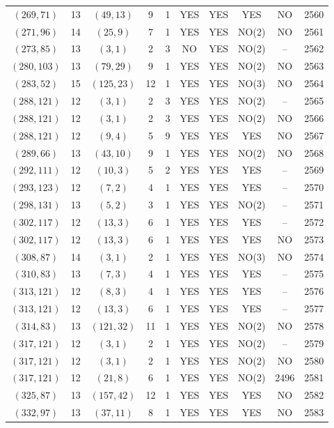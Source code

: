 \begin{longtable}{|c|c|c|c|c|c|c|c|c|c|}
$(269, 71)$ & 13 & $(49, 13)$ & 9 & 1 & YES & YES & YES & NO & 2560\\
$(271, 96)$ & 14 & $(25, 9)$ & 7 & 1 & YES & YES & NO(2) & NO & 2561\\
$(273, 85)$ & 13 & $(3, 1)$ & 2 & 3 & NO & YES & NO(2) & -- & 2562\\
$(280, 103)$ & 13 & $(79, 29)$ & 9 & 1 & YES & YES & NO(2) & NO & 2563\\
$(283, 52)$ & 15 & $(125, 23)$ & 12 & 1 & YES & YES & NO(3) & NO & 2564\\
$(288, 121)$ & 12 & $(3, 1)$ & 2 & 3 & YES & YES & NO(2) & -- & 2565\\
$(288, 121)$ & 12 & $(3, 1)$ & 2 & 3 & YES & YES & NO(2) & NO & 2566\\
$(288, 121)$ & 12 & $(9, 4)$ & 5 & 9 & YES & YES & YES & NO & 2567\\
$(289, 66)$ & 13 & $(43, 10)$ & 9 & 1 & YES & YES & NO(2) & NO & 2568\\
$(292, 111)$ & 12 & $(10, 3)$ & 5 & 2 & YES & YES & YES & -- & 2569\\
$(293, 123)$ & 12 & $(7, 2)$ & 4 & 1 & YES & YES & YES & -- & 2570\\
$(298, 131)$ & 13 & $(5, 2)$ & 3 & 1 & YES & YES & NO(2) & -- & 2571\\
$(302, 117)$ & 12 & $(13, 3)$ & 6 & 1 & YES & YES & YES & -- & 2572\\
$(302, 117)$ & 12 & $(13, 3)$ & 6 & 1 & YES & YES & YES & NO & 2573\\
$(308, 87)$ & 14 & $(3, 1)$ & 2 & 1 & YES & YES & NO(3) & NO & 2574\\
$(310, 83)$ & 13 & $(7, 3)$ & 4 & 1 & YES & YES & YES & -- & 2575\\
$(313, 121)$ & 12 & $(8, 3)$ & 4 & 1 & YES & YES & YES & -- & 2576\\
$(313, 121)$ & 12 & $(13, 3)$ & 6 & 1 & YES & YES & YES & -- & 2577\\
$(314, 83)$ & 13 & $(121, 32)$ & 11 & 1 & YES & YES & NO(2) & NO & 2578\\
$(317, 121)$ & 12 & $(3, 1)$ & 2 & 1 & YES & YES & NO(2) & -- & 2579\\
$(317, 121)$ & 12 & $(3, 1)$ & 2 & 1 & YES & YES & NO(2) & NO & 2580\\
$(317, 121)$ & 12 & $(21, 8)$ & 6 & 1 & YES & YES & NO(2) & 2496 & 2581\\
$(325, 87)$ & 13 & $(157, 42)$ & 12 & 1 & YES & YES & YES & NO & 2582\\
$(332, 97)$ & 13 & $(37, 11)$ & 8 & 1 & YES & YES & YES & NO & 2583\\

\end{longtable}

